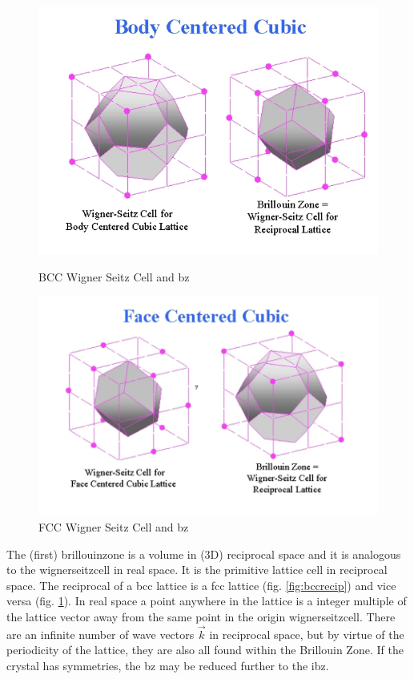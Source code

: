 \FloatBarrier
\begin{figure}[!htb]
\includegraphics[width=\linewidth]{chapters/interatomic_potential_fitting/images/bcc_wcs_bz.png}
\caption{BCC Wigner Seitz Cell and \acrshort{bz} \cite{fccbccreciprocal}}
\label{fig:bccrecip}
\endminipage\hfill
{}
\includegraphics[width=\linewidth]{chapters/interatomic_potential_fitting/images/fcc_wcs_bz.png}
\caption{FCC Wigner Seitz Cell and \acrshort{bz} \cite{fccbccreciprocal}}
\label{fig:fccrecip}
\endminipage
\end{figure}
\FloatBarrier

The (first) \Gls{brillouinzone} is a volume in (3D) reciprocal space and it is analogous to the \Gls{wignerseitzcell} in real space.  It is the primitive lattice cell in reciprocal space.  The reciprocal of a \acrshort{bcc} lattice is a \acrshort{fcc} lattice (fig. \ref{fig:bccrecip}) and vice versa (fig. \ref{fig:fccrecip}).  In real space a point anywhere in the lattice is a integer multiple of the lattice vector away from the same point in the origin \Gls{wignerseitzcell}.  There are an infinite number of wave vectors $\vec{k}$ in reciprocal space, but by virtue of the periodicity of the lattice, they are also all found within the Brillouin Zone.  If the crystal has symmetries, the \acrshort{bz} may be reduced further to the \acrlong{ibz}.

